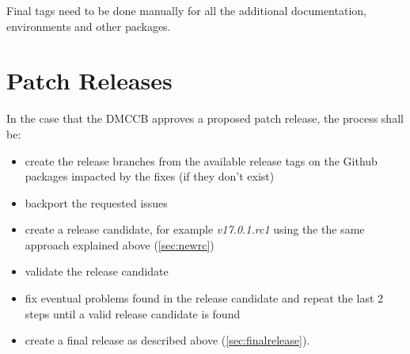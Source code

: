 Final tags need to be done manually for all the additional documentation, environments and other packages.

\newpage

\section{Patch Releases} \label{sec:patchreleases}

In the case that the DMCCB approves a proposed patch release, the process shall be:

\begin{itemize}
\item create the release branches from the available release tags on the Github packages impacted by the fixes (if they don't exist)
\item backport the requested issues
\item create a release candidate, for example \textit{v17.0.1.rc1} using the the same approach explained above (\ref{sec:newrc})
\item validate the release candidate
\item fix eventual problems found in the release candidate and repeat the last 2 steps until a valid release candidate is found
\item create a final release as described above (\ref{sec:finalrelease}).
\end{itemize}


